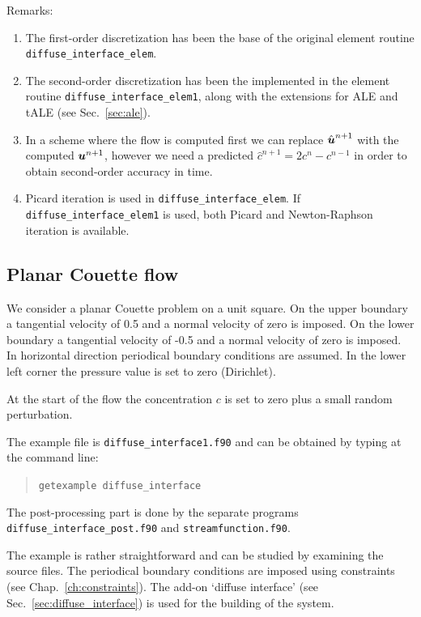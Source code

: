 Remarks:
\begin{enumerate}
	\item The first-order discretization has been the base of the original
	element routine\\ \texttt{diffuse\_interface\_elem}.
	\item The second-order discretization has been the implemented in the
	element routine \texttt{diffuse\_interface\_elem1}, along with the
	extensions for ALE and tALE (see Sec.~\ref{sec:ale}).
	\item In a scheme where the flow is computed first we can replace 
	$\hat{\boldsymbol{u}}^{n+1}$ with the computed $\boldsymbol{u}^{n+1}$, however 
	we need a predicted $\hat{c}^{n+1}=2c^n-c^{n-1}$ in order to obtain
	second-order accuracy in time.
	\item Picard iteration is used in  \texttt{diffuse\_interface\_elem}.
	If \texttt{diffuse\_interface\_elem1} is used, both Picard and
	Newton-Raphson iteration is available. 
\end{enumerate}

\subsection{Planar Couette flow}
\label{sec:couettedi}

We consider a planar Couette problem on a unit square.
On the upper boundary a tangential
velocity of 0.5 and a normal velocity of zero is imposed.
On the lower boundary a tangential
velocity of -0.5 and a normal velocity of zero is imposed.
In horizontal direction periodical boundary conditions are assumed.
In the lower left corner the pressure value is set to zero (Dirichlet).

At the start of the flow the concentration $c$ is set to zero
plus a small random perturbation.

The example file is \texttt{diffuse\_interface1.f90}
and can be obtained by typing at the
command line:
\medskip
\begin{quote}
   \texttt{getexample diffuse\_interface}
\end{quote}
The post-processing part is done by the separate programs
\texttt{diffuse\_interface\_post.f90} and \texttt{streamfunction.f90}.

The example is rather straightforward and can be studied by examining the
source files. The periodical boundary conditions are imposed using
constraints (see Chap.~\ref{ch:constraints}).
The add-on `diffuse interface' (see Sec.~\ref{sec:diffuse_interface})
is used for the building of the system. 

